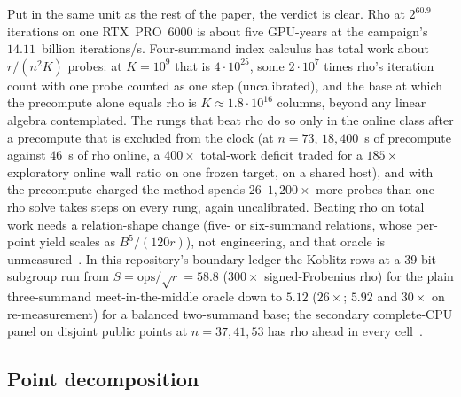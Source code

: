 Put in the same unit as the rest of the paper, the verdict is
clear. Rho at $2^{60.9}$ iterations on one RTX~PRO~6000 is about five
GPU-years at the campaign's $14.11$~billion iterations/s. Four-summand index calculus
has total work about $r/(n^2K)$ probes: at $K=10^9$ that is
$4\cdot10^{25}$, some $2\cdot10^7$ times rho's iteration count with one
probe counted as one step (uncalibrated), and the base at which the precompute alone equals
rho is $K\approx1.8\cdot10^{16}$ columns, beyond any linear algebra
contemplated. The rungs that beat rho do so only in the online class
after a precompute that is excluded from the clock (at $n=73$, $18{,}400$~s of precompute against $46$~s of rho online, a
$400\times$ total-work deficit traded for a $185\times$ exploratory
online wall ratio on one frozen target, on a shared host), and with
the precompute charged the method spends $26$--$1{,}200\times$ more
probes than one rho solve takes steps on every rung, again
uncalibrated.
Beating rho on total work needs a relation-shape change (five- or
six-summand relations, whose per-point yield scales as $B^5/(120r)$),
not engineering, and that oracle is unmeasured~.
In this repository's boundary ledger the Koblitz rows at a 39-bit
subgroup run from $S=\text{ops}/\sqrt r=58.8$ ($300\times$
signed-Frobenius rho) for the plain three-summand meet-in-the-middle
oracle down to $5.12$ ($26\times$; $5.92$ and $30\times$ on
re-measurement) for a balanced two-summand base; the secondary
complete-CPU panel on disjoint public points at $n=37,41,53$ has rho
ahead in every cell~.

\subsection{Point decomposition}
\label{sec:alt-pdp}

